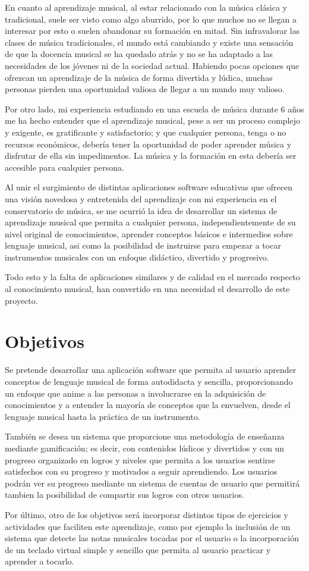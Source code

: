 En cuanto al aprendizaje musical, al estar relacionado con la música clásica y tradicional, suele ser visto como algo aburrido,
por lo que muchos no se llegan a interesar por esto o suelen abandonar su formación en mitad.
Sin infravalorar las clases de música tradicionales, el mundo está cambiando y existe una sensación de que la docencia musical se ha quedado atrás y no se ha adaptado
a las necesidades de los jóvenes ni de la sociedad actual.
Habiendo pocas opciones que ofrezcan un aprendizaje de la música de forma divertida y lúdica, muchas personas pierden una oportunidad valiosa de llegar a un mundo muy valioso.

Por otro lado, mi experiencia estudiando en una escuela de música durante 6 años me ha hecho entender que el aprendizaje musical, pese a ser un proceso complejo y exigente,
es gratificante y satisfactorio; y que cualquier persona, tenga o no recursos económicos, debería tener la oportunidad de poder aprender música y disfrutar de ella sin impedimentos.
La música y la formación en esta debería ser accesible para cualquier persona.

Al unir el surgimiento de distintas aplicaciones software educativas que ofrecen una visión novedosa y entretenida del aprendizaje con mi experiencia en 
el conservatorio de música, se me ocurrió la idea de desarrollar un sistema de aprendizaje musical que permita a cualquier persona, independientemente
de su nivel original de conocimientos, aprender conceptos básicos e intermedios sobre lenguaje musical, asi como
la posibilidad de instruirse para empezar a tocar instrumentos musicales con un enfoque didáctico, divertido y progresivo.

Todo esto y la falta de aplicaciones similares y de calidad en el mercado respecto al conocimiento musical, han convertido en una necesidad el desarrollo de este proyecto.
\newpage
\section{Objetivos}
Se pretende desarrollar una aplicación software que permita al usuario aprender conceptos de lenguaje musical de forma autodidacta y sencilla,
proporcionando un enfoque que anime a las personas a involucrarse en la adquisición de conocimientos y a entender la mayoría de conceptos que la envuelven, desde el lenguaje musical
hasta la práctica de un instrumento. 

También se desea un sistema que proporcione una metodología de enseñanza mediante gamificación; es decir, con contenidos lúdicos y divertidos y 
con un progreso organizado en logros y niveles que permita a los usuarios sentirse satisfechos con su progreso y motivados a seguir aprendiendo. 
Los usuarios podrán ver su progreso mediante un sistema de cuentas de usuario que permitirá tambien la posibilidad de compartir sus logros con otros usuarios.

Por último, otro de los objetivos será incorporar distintos tipos de ejercicios y actividades que faciliten este aprendizaje, como por ejemplo la inclusión de un sistema que detecte las notas musicales
tocadas por el usuario o la incorporación de un teclado virtual simple y sencillo que permita al usuario practicar y aprender a tocarlo.
